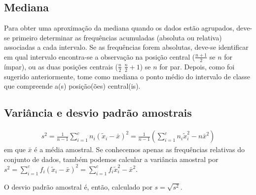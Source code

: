 \subsection{Mediana}

Para obter uma aproximação da mediana quando os dados estão agrupados, deve-se primeiro determinar as frequências acumuladas (absoluta ou relativa) associadas a cada intervalo. Se as frequências forem absolutas, deve-se identificar em qual intervalo encontra-se a observação na posição central (\(\frac{n+1}{2}\) se \(n\) for ímpar), ou as duas posições centrais (\(\frac{n}{2}\) \(\frac{n}{2}+1\)) se \(n\) for par. Depois, como foi sugerido anteriormente, tome como mediana o ponto médio do intervalo de classe que compreende a(s) posição(ões) central(is).

\subsection{Variância e desvio padrão amostrais}
\begin{equation*}
\begin{split}s^2 = \frac{1}{n-1}\sum^c_{i=1}n_i(\tilde{x}_i-\bar{x})^2=\frac{1}{n-1}\left(\sum^c_{i=1}n_i\tilde{x}^2_i- n\bar{x}^2\right )\end{split}
\end{equation*}
em que \(\bar{x}\) é a média amostral. Se conhecemos apenas as frequências relativas do conjunto de dados, também podemos calcular a variância amostral por \(s^2=\displaystyle{\sum^c_{i=1}}f_i(\tilde{x}_i-\bar{x})^2=\displaystyle{\sum^c_{i=1}}f_i\tilde{x}^2_i -\bar{x}^2\).

O desvio padrão amostral é, então, calculado por \(s=\sqrt{s^2}\).

